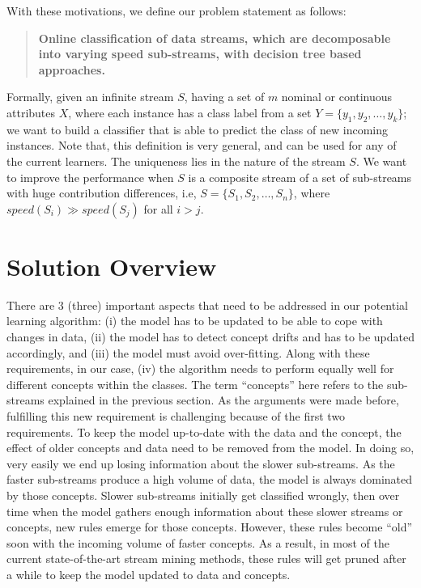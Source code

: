 With these motivations, we define our problem statement as follows:

\begin{quotation}
    \textbf{Online classification of data streams, which are decomposable into varying speed sub-streams, with decision tree based approaches.}
\end{quotation}

\noindent Formally, given an infinite stream $S$, having a set of $m$ nominal or continuous attributes $X$, where each instance has a class label from a set $Y = \{y_1, y_2, \dots, y_k\}$; we want to build a classifier that is able to predict the class of new incoming instances. Note that, this definition is very general, and can be used for any of the current learners. The uniqueness lies in the nature of the stream $S$. We want to improve the performance when $S$ is a composite stream of a set of sub-streams with huge contribution differences, i.e, $S = \{S_1, S_2, \dots, S_n\}$, where $speed(S_i) \gg speed(S_j)$ for all $i > j$.


\section{Solution Overview}
There are 3 (three) important aspects that need  to be addressed in our potential learning algorithm: (i) the model has to be updated to be able to cope with changes in data, (ii) the model has to detect concept drifts and has to be updated accordingly, and (iii) the model must avoid over-fitting. Along with these requirements, in our case, (iv) the algorithm needs to perform equally well for different concepts within the classes. The term ``concepts'' here refers to the sub-streams explained in the previous section. As the arguments were made before, fulfilling this new requirement is challenging because of the first two requirements. To keep the model up-to-date with the data and the concept, the effect of older concepts and data need to be removed from the model. In doing so, very easily we end up losing information about the slower sub-streams. As the faster sub-streams produce a high volume of data, the model is always dominated by those concepts. Slower sub-streams initially get classified wrongly, then over time when the model gathers enough information about these slower streams or concepts, new rules emerge for those concepts. However, these rules become ``old''  soon with the incoming volume of faster concepts. As a result, in most of the current state-of-the-art stream mining methods, these rules will get pruned after a while to keep the model updated to data and concepts.

